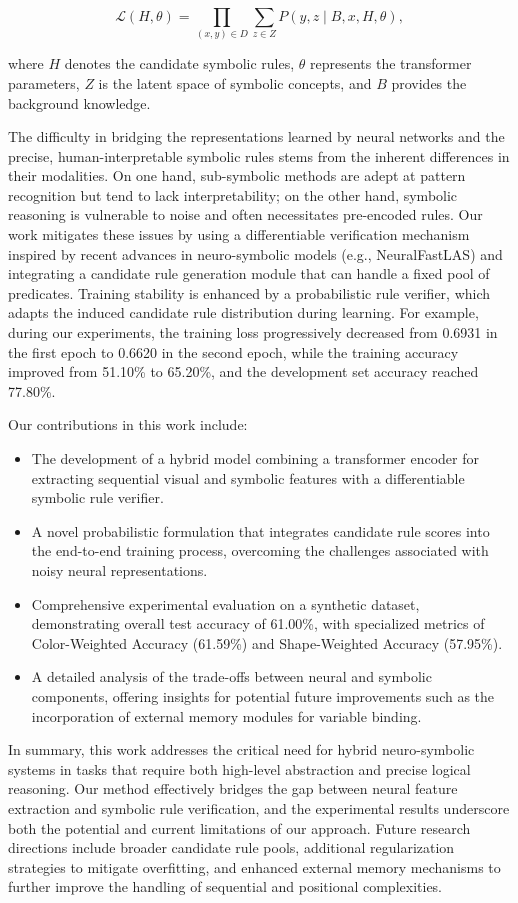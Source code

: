 \documentclass{article}
\begin{document}
\[
\mathcal{L}(H,\theta)=\prod_{(x,y)\in D}\sum_{z\in Z} P(y,z\mid B,x,H,\theta),
\]

where \(H\) denotes the candidate symbolic rules, \(\theta\) represents the transformer parameters, \(Z\) is the latent space of symbolic concepts, and \(B\) provides the background knowledge.

The difficulty in bridging the representations learned by neural networks and the precise, human-interpretable symbolic rules stems from the inherent differences in their modalities. On one hand, sub-symbolic methods are adept at pattern recognition but tend to lack interpretability; on the other hand, symbolic reasoning is vulnerable to noise and often necessitates pre-encoded rules. Our work mitigates these issues by using a differentiable verification mechanism inspired by recent advances in neuro-symbolic models (e.g., NeuralFastLAS) and integrating a candidate rule generation module that can handle a fixed pool of predicates. Training stability is enhanced by a probabilistic rule verifier, which adapts the induced candidate rule distribution during learning. For example, during our experiments, the training loss progressively decreased from 0.6931 in the first epoch to 0.6620 in the second epoch, while the training accuracy improved from 51.10\% to 65.20\%, and the development set accuracy reached 77.80\%.

Our contributions in this work include:
\begin{itemize}
    \item The development of a hybrid model combining a transformer encoder for extracting sequential visual and symbolic features with a differentiable symbolic rule verifier.
    \item A novel probabilistic formulation that integrates candidate rule scores into the end-to-end training process, overcoming the challenges associated with noisy neural representations.
    \item Comprehensive experimental evaluation on a synthetic dataset, demonstrating overall test accuracy of 61.00\%, with specialized metrics of Color-Weighted Accuracy (61.59\%) and Shape-Weighted Accuracy (57.95\%).
    \item A detailed analysis of the trade-offs between neural and symbolic components, offering insights for potential future improvements such as the incorporation of external memory modules for variable binding.
\end{itemize}

In summary, this work addresses the critical need for hybrid neuro-symbolic systems in tasks that require both high-level abstraction and precise logical reasoning. Our method effectively bridges the gap between neural feature extraction and symbolic rule verification, and the experimental results underscore both the potential and current limitations of our approach. Future research directions include broader candidate rule pools, additional regularization strategies to mitigate overfitting, and enhanced external memory mechanisms to further improve the handling of sequential and positional complexities.
\end{document}
